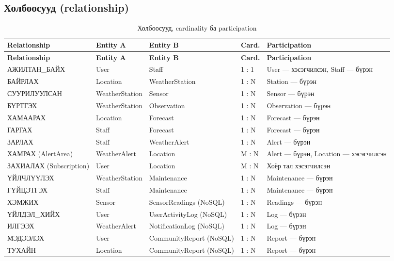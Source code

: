 \documentclass[12pt,a4paper]{article}
\begin{document}
\subsection{Холбоосууд (relationship)}
{\small
\begin{longtable}{L{3.7cm}L{2.5cm}L{3.3cm}C{1.3cm}L{3.5cm}}
\caption{Холбоосууд, cardinality ба participation}\label{tab:rels}\\
\toprule
\textbf{Relationship} & \textbf{Entity A} & \textbf{Entity B} & \textbf{Card.} & \textbf{Participation}\\
\midrule
\endfirsthead
\toprule
\textbf{Relationship} & \textbf{Entity A} & \textbf{Entity B} & \textbf{Card.} & \textbf{Participation}\\
\midrule
\endhead
\bottomrule
\endfoot
АЖИЛТАН\_БАЙХ & User & Staff & 1 : 1 & User — хэсэгчилсэн, Staff — бүрэн\\
БАЙРЛАХ & Location & WeatherStation & 1 : N & Station — бүрэн\\
СУУРИЛУУЛСАН & WeatherStation & Sensor & 1 : N & Sensor — бүрэн\\
БҮРТГЭХ & WeatherStation & Observation & 1 : N & Observation — бүрэн\\
ХАМААРАХ & Location & Forecast & 1 : N & Forecast — бүрэн\\
ГАРГАХ & Staff & Forecast & 1 : N & Forecast — бүрэн\\
ЗАРЛАХ & Staff & WeatherAlert & 1 : N & Alert — бүрэн\\
ХАМРАХ (AlertArea) & WeatherAlert & Location & M : N & Alert — бүрэн, Location — хэсэгчилсэн\\
ЗАХИАЛАХ (Subscription) & User & Location & M : N & Хоёр тал хэсэгчилсэн\\
ҮЙЛЧЛҮҮЛЭХ & WeatherStation & Maintenance & 1 : N & Maintenance — бүрэн\\
ГҮЙЦЭТГЭХ & Staff & Maintenance & 1 : N & Maintenance — бүрэн\\
ХЭМЖИХ & Sensor & SensorReadings (NoSQL) & 1 : N & Readings — бүрэн\\
ҮЙЛДЭЛ\_ХИЙХ & User & UserActivityLog (NoSQL) & 1 : N & Log — бүрэн\\
ИЛГЭЭХ & WeatherAlert & NotificationLog (NoSQL) & 1 : N & Log — бүрэн\\
МЭДЭЭЛЭХ & User & CommunityReport (NoSQL) & 1 : N & Report — бүрэн\\
ТУХАЙН & Location & CommunityReport (NoSQL) & 1 : N & Report — бүрэн\\
\end{longtable}
}
\end{document}
